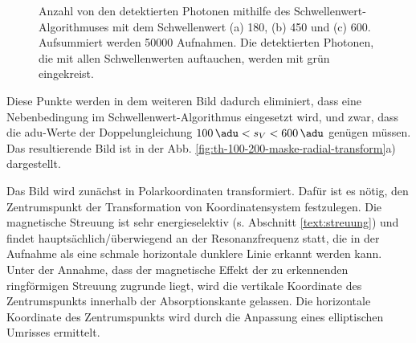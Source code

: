 \begin{figure}[H]
    \centering
    
    \caption{Anzahl von den detektierten Photonen mithilfe des Schwellenwert-Algorithmuses mit dem Schwellenwert (a) \SI{180}{\adu}, (b) \SI{450}{\adu} und (c) \SI{600}{\adu}. Aufsummiert werden \num{50000} Aufnahmen. Die detektierten Photonen, die mit allen Schwellenwerten auftauchen, werden mit grün eingekreist.}
    \label{fig:th_180_450_600}
\end{figure}
\noindent
Diese Punkte werden in dem weiteren Bild dadurch eliminiert, dass eine Nebenbedingung im Schwellenwert-Algorithmus eingesetzt wird, und zwar, dass die \gls{adu}-Werte der Doppelungleichung $\SI{100}{\adu} < s_V < \SI{600}{\adu}$ genügen müssen. Das resultierende Bild ist in der Abb. \ref{fig:th-100-200-maske-radial-transform}a) dargestellt.

\noindent
Das Bild wird zunächst in Polarkoordinaten transformiert. Dafür ist es nötig, den Zentrumspunkt der Transformation von Koordinatensystem festzulegen. Die magnetische Streuung ist sehr energieselektiv (s. Abschnitt \ref{text:streuung}) und findet hauptsächlich/überwiegend an der Resonanzfrequenz statt, die in der Aufnahme als eine schmale horizontale dunklere Linie erkannt werden kann. Unter der Annahme, dass der magnetische Effekt der zu erkennenden ringförmigen Streuung zugrunde liegt, wird die vertikale Koordinate des Zentrumspunkts innerhalb der Absorptionskante gelassen. Die horizontale Koordinate des Zentrumspunkts wird durch die Anpassung eines elliptischen Umrisses ermittelt.

